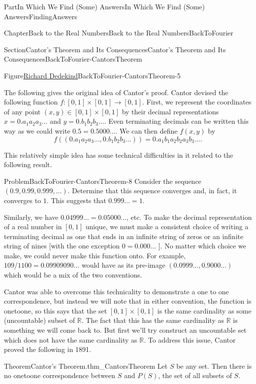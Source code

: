 \documentclass[oneside,10pt,]{book}
\numberwithin{equation}{part}
\newcommand{\RR}{\mathbb {R}}
\begin{document}
\begin{partptx}{Part}{In Which We Find (Some) Answers}{}{In Which We Find (Some) Answers}{}{}{FindingAnswers}
\begin{chapterptx}{Chapter}{Back to the Real Numbers}{}{Back to the Real Numbers}{}{}{BackToFourier}
\begin{sectionptx}{Section}{Cantor's Theorem and Its Consequences}{}{Cantor's Theorem and Its Consequences}{}{}{BackToFourier-CantorsTheorem}
\begin{figureptx}{Figure}{\href{https://mathshistory.st-andrews.ac.uk/Biographies/Dedekind/}{Richard Dedekind}}{BackToFourier-CantorsTheorem-5}{}
\begin{image}{0.325}{0.35}{0.325}{}
\end{image}%
\tcblower
\end{figureptx}%
The following gives the original idea of Cantor's proof.  Cantor devised the following function \(f:[0,1]\times[0,1]\rightarrow
[0,1]\).  First, we represent the coordinates of any point \((x,y)\in [0,1]\times[0,1]\) by their decimal representations \(x=0.a_1 a_2 a_3\ldots\) and \(y=0.b_1 b_2
b_3\ldots\).  Even terminating decimals can be written this way as we could write \(0.5=0.5000\ldots\).  We can then define \(f(x,y)\) by%
\begin{equation*}
f((0.a_1 a_2 a_3\ldots ,0.b_1 b_2
b_3\ldots))=0.a_1 b_1 a_2 b_2 a_3 b_3\ldots \text{.}
\end{equation*}
%
\par
This relatively simple idea has some technical difficulties in it related to the following result.%
\begin{problem}{Problem}{}{BackToFourier-CantorsTheorem-8}%
Consider the sequence \((0.9,0.99,0.999,\ldots)\). Determine that this sequence converges and, in fact, it converges to \(1\).  This suggests that \(0.999\ldots=1\).%
\end{problem}
Similarly, we have \(0.04999\ldots=0.05000\ldots\), etc.  To make the decimal representation of a real number in \([0,1]\) unique, we must make a consistent choice of writing a terminating decimal as one that ends in an infinite string of zeros or an infinite string of nines [with the one exception \(0=0.000\ldots\) ]. No matter which choice we make, we could never make this function onto.  For example, \(109/1100=0.09909090\ldots\) would have as its pre-image \((0.0999\ldots,0.9000\ldots)\) which would be a mix of the two conventions.%
\par
Cantor was able to overcome this technicality to demonstrate a one to one correspondence, but instead we will note that in either convention, the function is one\textendash{}to\textendash{}one, so this says that the set \([0,1]\times[0,1]\) is the same cardinality as some (uncountable) subset of \(\RR\).  The fact that this has the same cardinality as \(\RR\) is something we will come back to.  But first we'll try construct an uncountable set which does not have the same cardinality as \(\RR\).  To address this issue, Cantor proved the following in 1891.%
\begin{theorem}{Theorem}{Cantor's Theorem.}{}{thm_CantorsTheorem}%
%
Let \(S\) be any set.  Then there is no one\textendash{}to\textendash{}one correspondence between \(S\) and \(P(S)\), the set of all subsets of \(S\).%

\end{theorem}
\end{sectionptx}
\end{chapterptx}
\end{partptx}
\end{document}
